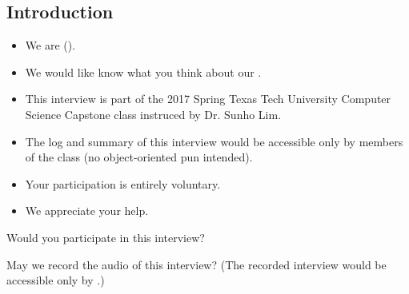 \subsection{Introduction}

\begin{itemize}
\item We are \tc{} (\names).
\item We would like know what you think about
  our \cry{} \cf.
\item This interview is part of the 2017 Spring
  Texas Tech University Computer Science Capstone class
  instruced by Dr. Sunho Lim.
\item The log and summary of this interview
  would be accessible only by members of the class
  (no object-oriented pun intended).
\item Your participation is entirely voluntary.
\item We appreciate your help.
\end{itemize}

\begin{question}
Would you participate in this interview?
\end{question}

\begin{question}
May we record the audio of this interview?
(The recorded interview would be accessible only by \tc.)
\end{question}
